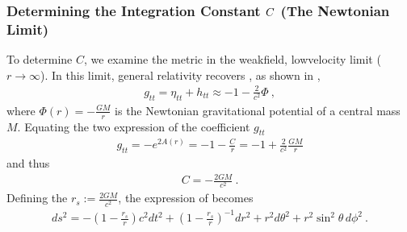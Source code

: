 \documentclass[letterpaper,10pt,english]{jupyterBook}
\begin{document}
\subsubsection{Determining the Integration Constant \protect\(C\protect\) (The Newtonian Limit)}
\label{\detokenize{ch/relativity-general/schwarzschild-metric:determining-the-integration-constant-c-the-newtonian-limit}}
\sphinxAtStartPar
To determine \(C\), we examine the metric in the weak\sphinxhyphen{}field, low\sphinxhyphen{}velocity limit (\(r \to \infty\)). In this limit, general relativity recovers , as shown in {\hyperref[\detokenize{ch/relativity-general/einstein-equation:relativity-general-notes-einstein-equation-classical-limit}]{}},
\begin{equation*}
\begin{split}g_{tt} = \eta_{tt} + h_{tt} \approx - 1 - \frac{2}{c^2} \Phi \ ,\end{split}
\end{equation*}
\sphinxAtStartPar
where \(\Phi(r) = - \frac{GM}{r}\) is the Newtonian gravitational potential of a central mass \(M\). Equating the two expression of the coefficient \(g_{tt}\)
\begin{equation*}
\begin{split}g_{tt} = -e^{2A(r)} = - 1 - \frac{C}{r} = - 1 + \frac{2}{c^2} \frac{G M}{r} \end{split}
\end{equation*}
\sphinxAtStartPar
and thus
\begin{equation*}
\begin{split}C = - \frac{2GM}{c^2} \ .\end{split}
\end{equation*}
\sphinxAtStartPar
Defining the  \(r_s := \frac{2GM}{c^2}\), the expression of  becomes
\begin{equation*}
\begin{split}
ds^2 =
- \left(1 - \frac{r_s}{r} \right) c^2 dt^2 + 
  \left(1 - \frac{r_s}{r} \right)^{-1} dr^2 + r^2 d \theta^2 + r^2 \sin^2 \theta \, d\phi^2 \ .
\end{split}
\end{equation*}
\end{document}
